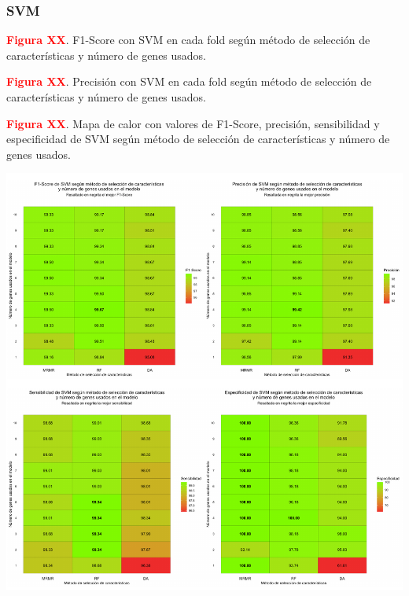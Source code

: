 \newpage
\subsubsection{SVM}

\textbf{\textcolor{red}{Figura XX}}. F1-Score con SVM en cada fold según método de selección de características y número de genes usados.

\newpage
\textbf{\textcolor{red}{Figura XX}}. Precisión con SVM en cada fold según método de selección de características y número de genes usados.

\newpage
\textbf{\textcolor{red}{Figura XX}}. Mapa de calor con valores de F1-Score, precisión, sensibilidad y especificidad de SVM según método de selección de características y número de genes usados.
\begin{center}
	\includegraphics[width=1\textwidth]{figuras/higado_biclase_heatmap_svm.pdf} \\
\end{center}

